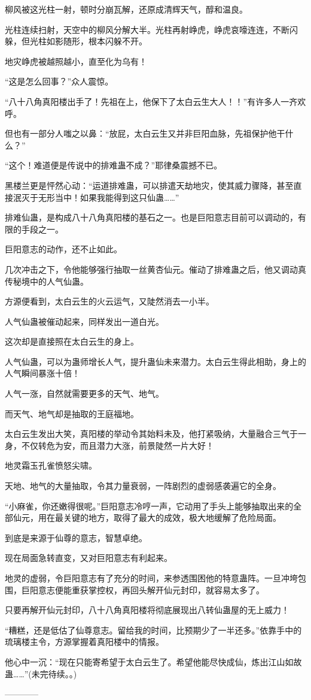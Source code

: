 \begin{this_body}
柳风被这光柱一射，顿时分崩瓦解，还原成清辉天气，醇和温良。

光柱连续扫射，天空中的柳风分解大半。光柱再射峥虎，峥虎哀嚎连连，不断闪躲，但光柱如影随形，根本闪躲不开。

地灾峥虎被越照越小，直至化为乌有！

“这是怎么回事？”众人震惊。

“八十八角真阳楼出手了！先祖在上，他保下了太白云生大人！！”有许多人一齐欢呼。

但也有一部分人嗤之以鼻：“放屁，太白云生又并非巨阳血脉，先祖保护他干什么？”

“这个！难道便是传说中的排难蛊不成？”耶律桑震撼不已。

黑楼兰更是怦然心动：“运道排难蛊，可以排遣天劫地灾，使其威力骤降，甚至直接泯灭于无形当中！如果我能得到这只仙蛊……”

排难仙蛊，是构成八十八角真阳楼的基石之一。也是巨阳意志目前可以调动的，有限的手段之一。

巨阳意志的动作，还不止如此。

几次冲击之下，令他能够强行抽取一丝黄杏仙元。催动了排难蛊之后，他又调动真传秘境中的人气仙蛊。

方源便看到，太白云生的火云运气，又陡然消去一小半。

人气仙蛊被催动起来，同样发出一道白光。

这次却是直接照在太白云生的身上。

人气仙蛊，可以为蛊师增长人气，提升蛊仙未来潜力。太白云生得此相助，身上的人气瞬间暴涨十倍！

人气一涨，自然就需要更多的天气、地气。

而天气、地气却是抽取的王庭福地。

太白云生发出大笑，真阳楼的举动令其始料未及，他打紧吸纳，大量融合三气于一身，不仅转危为安，而且潜力大涨，前景陡然一片大好！

地灵霜玉孔雀愤怒尖啸。

天地、地气的大量抽取，令其力量衰弱，一阵剧烈的虚弱感袭遍它的全身。

“小麻雀，你还嫩得很呢。”巨阳意志冷哼一声，它动用了手头上能够抽取出来的全部仙元，用在最关键的地方，取得了最大的成效，极大地缓解了危险局面。

到底是来源于仙尊的意志，智慧卓绝。

现在局面急转直变，又对巨阳意志有利起来。

地灵的虚弱，令巨阳意志有了充分的时间，来参透围困他的特意蛊阵。一旦冲垮包围，巨阳意志便能重获掌控权，再回头解开仙元封印，就容易太多了。

只要再解开仙元封印，八十八角真阳楼将彻底展现出八转仙蛊屋的无上威力！

“糟糕，还是低估了仙尊意志。留给我的时间，比预期少了一半还多。”依靠手中的琉璃楼主令，方源掌握着真阳楼中的情报。

他心中一沉：“现在只能寄希望于太白云生了。希望他能尽快成仙，炼出江山如故蛊……”(未完待续。。)

------------

\end{this_body}

